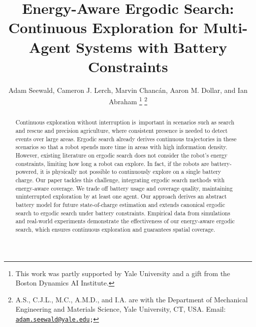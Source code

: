 \documentclass[letterpaper,10pt,conference,twoside]{IEEEtran}
\theoremstyle{definition}
\begin{document}

\title{\LARGE\bf Energy-Aware Ergodic Search: Continuous Exploration for Multi-Agent Systems with Battery Constraints}

\author{Adam Seewald, Cameron J. Lerch, Marvin Chanc{\'a}n, Aaron M. Dollar, and Ian Abraham
  \thanks{This work was partly supported by Yale University and a gift from the Boston Dynamics AI Institute.}
  \thanks{A.\hspace*{.4ex}S., C.\hspace*{.4ex}J.\hspace*{.4ex}L., M.\hspace*{.4ex}C., A.\hspace*{.4ex}M.\hspace*{.4ex}D., and I.\hspace*{.4ex}A. are with the Department of Mechanical Engineering and Materials Science, Yale University, CT, USA. Email: {\tt\footnotesize \href{mailto:adam.seewald@yale.edu}{adam.seewald@yale.edu};}}
}

\maketitle

\vspace*{-.5cm}
\begin{abstract} 
  Continuous exploration without interruption is~important in scenarios such as search and rescue and precision agriculture, where consistent presence is needed to detect events over large areas. Ergodic search already derives continuous trajectories in these scenarios so that a robot spends more time in areas with high information density. However, existing literature on ergodic search does not consider the robot's energy constraints, limiting how long a robot can explore. In fact, if the robots are battery-powered, it is physically not possible to continuously explore on a single battery charge. Our paper tackles this challenge, integrating ergodic search methods with energy-aware coverage. We trade off battery usage and coverage quality, maintaining uninterrupted exploration by at least one agent. Our approach derives an abstract battery model for future state-of-charge estimation and extends canonical ergodic search to ergodic search under battery constraints. Empirical data from simulations and real-world experiments demonstrate the effectiveness of our energy-aware ergodic search, which ensures continuous %
  exploration and guarantees spatial coverage.
\end{abstract}
\end{document}
